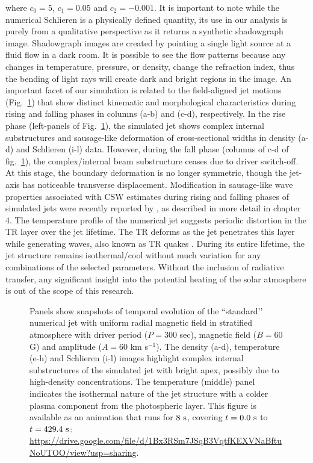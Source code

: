 where $c_0=5$, $c_1=0.05$ and $c_2=-0.001$. It is important to note while the numerical Schlieren is a physically defined quantity, its use in our analysis is purely from a qualitative perspective as it returns a synthetic shadowgraph image. Shadowgraph images are created by pointing a single light source at a fluid flow in a dark room. It is possible to see the flow patterns because any changes in temperature, pressure, or density, change the refraction index, thus the bending of light rays will create dark and bright regions in the image. An important facet of our simulation is related to the field-aligned jet motions (Fig.~\ref{standard_jet}) that show distinct kinematic and morphological characteristics during rising and falling phases in columns (a-b) and (c-d), respectively. In the rise phase (left-panels of Fig.~\ref{standard_jet}), the simulated jet shows complex internal substructures and sausage-like deformation of cross-sectional widths in density (a-d) and Schlieren (i-l) data. However, during the fall phase (columns of c-d of fig.~\ref{standard_jet}), the complex/internal beam substructure ceases due to driver switch-off. At this stage, the boundary deformation is no longer symmetric, though the jet-axis has noticeable transverse displacement. Modification in sausage-like wave properties associated with CSW estimates during rising and falling phases of simulated jets were recently reported by \cite{Dover2020ApJ90572D}, as described in more detail in chapter 4. The temperature profile of the numerical jet suggests periodic distortion in the TR layer over the jet lifetime. The TR deforms as the jet penetrates this layer while generating waves, also known as TR quakes \citep{Scullion2011}. During its entire lifetime, the jet structure remains isothermal/cool without much variation for any combinations of the selected parameters. Without the inclusion of radiative transfer, any significant insight into the potential heating of the solar atmosphere is out of the scope of this research. \np
\begin{figure}
\captionsetup[subfigure]{labelformat=empty}
\centering
{}
\caption{Panels show snapshots of temporal evolution of the ``standard’’ numerical jet with uniform radial magnetic field in stratified atmosphere with driver period ($P = 300$ sec), magnetic field ($B = 60$ G) and amplitude ($A = 60$ km s$^{-1}$). The density (a-d), temperature (e-h) and Schlieren (i-l) images highlight complex internal substructures of the simulated jet with bright apex, possibly due to high-density concentrations. The temperature (middle) panel indicates the isothermal nature of the jet structure with a colder plasma component from the photospheric layer. This figure is available as an animation that runs for $8~\rm{s}$, covering $t=0.0~\rm{s}$ to $t=429.4~\rm{s}$: \url{https://drive.google.com/file/d/1Bx3RSm7JSqB3VqtfKEXVNaBftuNoUTOO/view?usp=sharing}.}
\label{standard_jet}
\end{figure}

